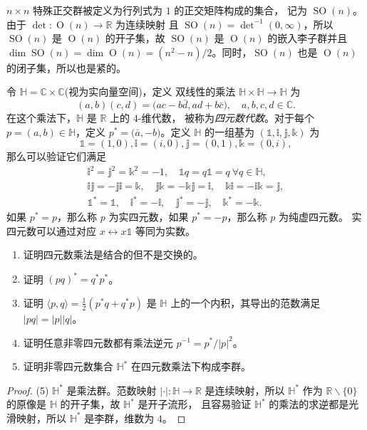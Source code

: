 \documentclass[fontset=none]{Notes}
\DeclareMathOperator\Orth{O}
\DeclareMathOperator\SO{SO}
\begin{document}
\begin{example}[特殊正交群]
  $n\times n$ 特殊正交群被定义为行列式为 $1$ 的正交矩阵构成的集合，
  记为 $\SO(n)$。由于 $\det:\Orth(n)\to \mathbb{R}$ 为连续映射
  且 $\SO(n)=\det^{-1}(0,\infty)$，所以 $\SO(n)$ 是 $\Orth(n)$
  的开子集，故 $\SO(n)$ 是 $\Orth(n)$ 的嵌入李子群并且
  $\dim \SO(n)=\dim\Orth(n)=(n^2-n)/2$。同时，$\SO(n)$
  也是 $\Orth(n)$ 的闭子集，所以也是紧的。
\end{example}


\begin{problem}{}{}
  令 $\mathbb{H}=\mathbb{C}\times \mathbb{C}$(视为实向量空间)，定义
  双线性的乘法 $\mathbb{H}\times \mathbb{H}\to \mathbb{H}$ 为
  \[
    (a,b)(c,d)=\bigl(ac-b\bar d,ad+b\bar c\bigr),\quad a,b,c,d\in \mathbb{C}.  
  \]
  在这个乘法下，$\mathbb{H}$ 是 $\mathbb{R}$ 上的 $4$-维代数，
  被称为\emph{四元数代数}。对于每个 $p=(a,b)\in \mathbb{H}$，定义
  $p^*=\bigl(\bar a,-b\bigr)$。定义 $\mathbb{H}$ 的一组基为
  $(\mathbb{1},\mathbb{i},\mathbb{j},\mathbb{k})$ 为
  \[
    \mathbb{1}=(1,0),\mathbb{i}=(i,0),\mathbb{j}=(0,1),\mathbb{k}=(0,i)  ,
  \]
  那么可以验证它们满足    
  \begin{gather*}
    \mathbb{i}^2=\mathbb{j}^2=\mathbb{k}^2=-1,\quad
    \mathbb{1}q=q \mathbb{1}=q\ \forall q\in \mathbb{H},\\
    \mathbb{ij}=-\mathbb{ji}=\mathbb{k},\quad \mathbb{jk}=-\mathbb{kj}=\mathbb{i},
    \quad \mathbb{ki}=-\mathbb{ik}=\mathbb{j},\\ 
    \mathbb{1}^*=\mathbb{1},\quad \mathbb{i}^*=-\mathbb{i},\quad \mathbb{j}^*=-\mathbb{j},
    \quad \mathbb{k}^*=-\mathbb{k}.
  \end{gather*}
  如果 $p^*=p$，那么称 $p$ 为实四元数，如果 $p^*=-p$，那么称 $p$ 为纯虚四元数。
  实四元数可以通过对应 $x\leftrightarrow x\mathbb{1}$ 等同为实数。
  \begin{enumerate}
    \item 证明四元数乘法是结合的但不是交换的。
    \item 证明 $(pq)^*=q^*p^*$。
    \item 证明 $\langle p,q\rangle=\frac{1}{2}(p^*q+q^*p)$ 是 $\mathbb{H}$
    上的一个内积，其导出的范数满足 $|pq|=|p||q|$。
    \item 证明任意非零四元数都有乘法逆元 $p^{-1}=p^*/|p|^2$。
    \item 证明非零四元数集合 $\mathbb{H}^*$ 在四元数乘法下构成李群。
  \end{enumerate} 
\end{problem}
\begin{proof}
  (5) $\mathbb{H}^*$ 是乘法群。范数映射 $|\cdot|:\mathbb{H}\to \mathbb{R}$
  是连续映射，所以 $\mathbb{H}^*$ 作为 $\mathbb{R}\smallsetminus\{0\}$
  的原像是 $\mathbb{H}$ 的开子集，故 $\mathbb{H}^*$ 是开子流形，
  且容易验证 $\mathbb{H}^*$ 的乘法的求逆都是光滑映射，所以 
  $\mathbb{H}^*$ 是李群，维数为 $4$。
\end{proof}
\end{document}

